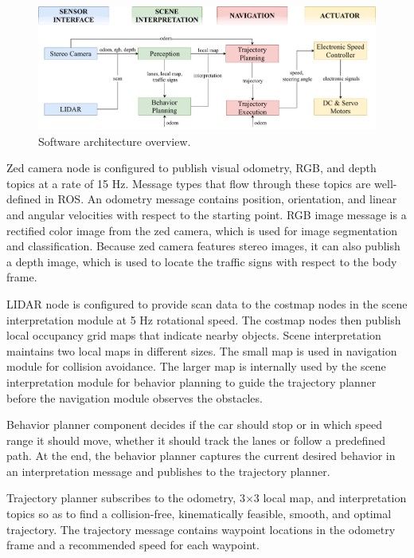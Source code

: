 \begin{figure}[h]
  \centering
  \includegraphics[width=.9\textwidth]{figures/software-architecture.pdf}
  \caption[Software architecture overview]{Software architecture overview.}
  \label{figure:software-architecture}
\end{figure}

Zed camera node is configured to publish visual odometry, RGB, and depth topics
at a rate of 15 Hz. Message types that flow through these topics are
well-defined in ROS. An odometry message contains position, orientation, and
linear and angular velocities with respect to the starting point. RGB image
message is a rectified color image from the zed camera, which is used for
image segmentation and classification. Because zed camera features stereo
images, it can also publish a depth image, which is used to locate the traffic
signs with respect to the body frame.

LIDAR node is configured to provide scan data to the costmap nodes in the scene
interpretation module at 5 Hz rotational speed. The costmap nodes then
publish local occupancy grid maps that indicate nearby objects. Scene
interpretation maintains two local maps in different sizes. The small map is
used in navigation module for collision avoidance. The larger map is
internally used by the scene interpretation module for behavior planning to
guide the trajectory planner before the navigation module observes the
obstacles.

Behavior planner component decides if the car should stop or in which speed
range it should move, whether it should track the lanes or follow a predefined
path. At the end, the behavior planner captures the current desired
behavior in an interpretation message and publishes to the trajectory planner.

Trajectory planner subscribes to the odometry, 3$\times$3 local map, and
interpretation topics so as to find a collision-free, kinematically feasible,
smooth, and optimal trajectory. The trajectory message contains waypoint
locations in the odometry frame and a recommended speed for each waypoint.

